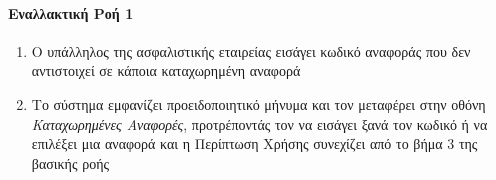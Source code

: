 \documentclass{../ol-softwaremanual}
\begin{document}
	\paragraph{Εναλλακτική Ροή 1}
	\begin{enumerate}
		\item Ο υπάλληλος της ασφαλιστικής εταιρείας εισάγει κωδικό αναφοράς που δεν αντιστοιχεί σε κάποια καταχωρημένη αναφορά
		\item Το σύστημα εμφανίζει προειδοποιητικό μήνυμα και τον μεταφέρει στην οθόνη \textit{Καταχωρημένες Αναφορές}, προτρέποντάς τον να εισάγει ξανά τον κωδικό ή να επιλέξει μια αναφορά και η Περίπτωση Χρήσης συνεχίζει από το βήμα 3 της βασικής ροής
	\end{enumerate}	
	
	\paragraph{}
	
\end{document}
